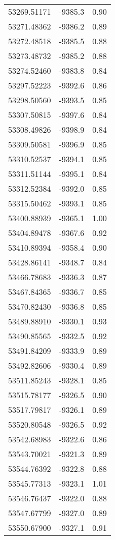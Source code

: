 \begin{table}
\begin{tabular}{l l l}
53269.51171	 & -9385.3 	 &  0.90\\
53271.48362	 & -9386.2	 &  0.89\\
53272.48518	 & -9385.5	 &  0.88\\
53273.48732	 & -9385.2	 &  0.88\\
53274.52460	 & -9383.8	 &  0.84\\
53297.52223	 & -9392.6	 &  0.86\\
53298.50560	 & -9393.5	 &  0.85\\
53307.50815	 & -9397.6	 &  0.84\\
53308.49826	 & -9398.9	 &  0.84\\
53309.50581	 & -9396.9	 &  0.85\\
53310.52537	 & -9394.1	 &  0.85\\
53311.51144	 & -9395.1	 &  0.84\\
53312.52384	 & -9392.0	 &  0.85\\
53315.50462	 & -9393.1	 &  0.85\\
53400.88939	 & -9365.1	 &  1.00\\
53404.89478	 & -9367.6	 &  0.92\\
53410.89394	 & -9358.4	 &  0.90\\
53428.86141	 & -9348.7	 &  0.84\\
53466.78683	 & -9336.3	 &  0.87\\
53467.84365	 & -9336.7	 &  0.85\\
53470.82430	 & -9336.8	 &  0.85\\
53489.88910	 & -9330.1	 &  0.93\\
53490.85565	 & -9332.5	 &  0.92\\
53491.84209	 & -9333.9	 &  0.89\\
53492.82606	 & -9330.4	 &  0.89\\
53511.85243	 & -9328.1	 &  0.85\\
53515.78177	 & -9326.5	 &  0.90\\
53517.79817	 & -9326.1	 &  0.89\\
53520.80548	 & -9326.5	 &  0.92\\
53542.68983	 & -9322.6	 &  0.86\\
53543.70021	 & -9321.3	 &  0.89\\
53544.76392	 & -9322.8	 &  0.88\\
53545.77313	 & -9323.1	 &  1.01\\
53546.76437	 & -9322.0	 &  0.88\\
53547.67799	 & -9327.0	 &  0.89\\
53550.67900	 & -9327.1	 &  0.91\\

\end{tabular}
\end{table}
